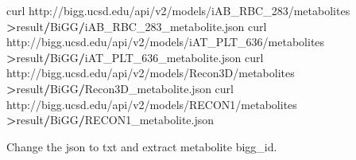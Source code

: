 \documentclass[
]{book}
\newenvironment{Shaded}{\begin{snugshade}}{\end{snugshade}}
\newcommand{\AttributeTok}[1]{\textcolor[rgb]{0.13,0.29,0.53}{#1}}
\newcommand{\DecValTok}[1]{\textcolor[rgb]{0.00,0.00,0.81}{#1}}
\newcommand{\DocumentationTok}[1]{\textcolor[rgb]{0.56,0.35,0.01}{\textbf{\textit{#1}}}}
\newcommand{\FunctionTok}[1]{\textcolor[rgb]{0.13,0.29,0.53}{\textbf{#1}}}
\newcommand{\NormalTok}[1]{#1}
\newcommand{\OtherTok}[1]{\textcolor[rgb]{0.56,0.35,0.01}{#1}}
\newcommand{\SpecialCharTok}[1]{\textcolor[rgb]{0.81,0.36,0.00}{\textbf{#1}}}
\newcommand{\StringTok}[1]{\textcolor[rgb]{0.31,0.60,0.02}{#1}}
\begin{document}
\begin{Shaded}
\begin{Highlighting}[]
\NormalTok{curl }\StringTok{\textquotesingle{}http://bigg.ucsd.edu/api/v2/models/iAB\_RBC\_283/metabolites\textquotesingle{}} \SpecialCharTok{\textgreater{}}\NormalTok{result}\SpecialCharTok{/}\NormalTok{BiGG}\SpecialCharTok{/}\NormalTok{iAB\_RBC\_283\_metabolite.json}
\NormalTok{curl }\StringTok{\textquotesingle{}http://bigg.ucsd.edu/api/v2/models/iAT\_PLT\_636/metabolites\textquotesingle{}} \SpecialCharTok{\textgreater{}}\NormalTok{result}\SpecialCharTok{/}\NormalTok{BiGG}\SpecialCharTok{/}\NormalTok{iAT\_PLT\_636\_metabolite.json}
\NormalTok{curl }\StringTok{\textquotesingle{}http://bigg.ucsd.edu/api/v2/models/Recon3D/metabolites\textquotesingle{}} \SpecialCharTok{\textgreater{}}\NormalTok{result}\SpecialCharTok{/}\NormalTok{BiGG}\SpecialCharTok{/}\NormalTok{Recon3D\_metabolite.json}
\NormalTok{curl }\StringTok{\textquotesingle{}http://bigg.ucsd.edu/api/v2/models/RECON1/metabolites\textquotesingle{}} \SpecialCharTok{\textgreater{}}\NormalTok{result}\SpecialCharTok{/}\NormalTok{BiGG}\SpecialCharTok{/}\NormalTok{RECON1\_metabolite.json}
\end{Highlighting}
\end{Shaded}

Change the json to txt and extract metabolite bigg\_id.

\begin{Shaded}
\end{Shaded}
\end{document}
